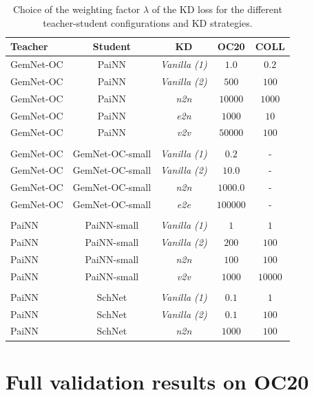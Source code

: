 \documentclass{article}
\begin{document}
\begin{table}[H]
\centering
\caption{Choice of the weighting factor $\lambda$ of the KD loss for the different teacher-student configurations and KD strategies.}
\begin{tabular}{lcccc}
\label{tab:KD_hypers}
Teacher & Student & KD & OC20 & COLL\\\hline
GemNet-OC & PaiNN & \emph{Vanilla (1)} & $1.0$ & $0.2$\\
GemNet-OC & PaiNN & \emph{Vanilla (2)} & $500$ & $100$ \\
GemNet-OC & PaiNN & \emph{n2n}         & $10000$ & $1000$ \\
GemNet-OC & PaiNN & \emph{e2n}         & $1000$ & $10$ \\
GemNet-OC & PaiNN & \emph{v2v}         & $50000$ & $100$ \\\\

GemNet-OC & GemNet-OC-small & \emph{Vanilla (1)} &$0.2$ & - \\
GemNet-OC & GemNet-OC-small & \emph{Vanilla (2)} &$10.0$ & - \\
GemNet-OC & GemNet-OC-small & \emph{n2n}         &$1000.0$ & - \\
GemNet-OC & GemNet-OC-small & \emph{e2e}         &$100000$ & -\\\\

PaiNN & PaiNN-small & \emph{Vanilla (1)} & $1$ & $1$ \\
PaiNN & PaiNN-small & \emph{Vanilla (2)} & $200$ & $100$ \\
PaiNN & PaiNN-small & \emph{n2n} & $100$ & $100$ \\
PaiNN & PaiNN-small & \emph{v2v} & $1000$& $10000$ \\\\

PaiNN & SchNet & \emph{Vanilla (1)} & $0.1$ & $1$ \\
PaiNN & SchNet & \emph{Vanilla (2)} & $0.1$ & $100$ \\
PaiNN & SchNet & \emph{n2n} & $1000$ & $100$ \\\hline
\end{tabular}
\end{table}

\newpage
\section{Full validation results on OC20} 
\label{ap:main_results_full}
\end{document}
